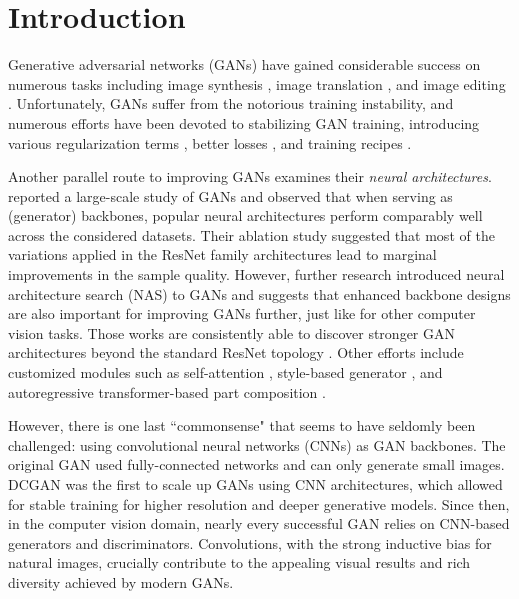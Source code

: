 \documentclass{article}
\begin{document}
\section{Introduction}
\label{introduction}
Generative adversarial networks (GANs) have gained considerable success on numerous tasks including image synthesis \cite{radford2015unsupervised,arjovsky2017wasserstein,gulrajani2017improved,miyato2018spectral,brock2018large}, image translation \cite{isola2017image,zhu2017unpaired,zhu2017toward,chen2020distilling}, and image editing \cite{yang2019controllable,jiang2021enlightengan}. Unfortunately, GANs suffer from the notorious training instability, and numerous efforts have been devoted to stabilizing GAN training, introducing various regularization terms \cite{kurach2019large,roth2017stabilizing,zhang2019consistency,mescheder2018training}, better losses \cite{gulrajani2017improved,mao2017least,jolicoeur2018relativistic,li2017mmd}, and training recipes \cite{salimans2016improved,karras2017progressive}.

Another parallel route to improving GANs examines their \textit{neural architectures}. \cite{lucic2018gans,kurach2019large} reported a large-scale study of GANs and observed that when serving as (generator) backbones, popular neural architectures perform comparably well across the considered datasets. Their ablation study suggested that most of the variations applied in the ResNet family architectures lead to marginal improvements in the sample quality. However, further research introduced neural architecture search (NAS) to GANs and suggests that enhanced backbone designs are also important for improving GANs further, just like for other computer vision tasks. Those works are consistently able to discover stronger GAN architectures beyond the standard ResNet topology \cite{gong2019autogan,gao2020adversarialnas,tian2020off}. Other efforts include customized modules such as self-attention \cite{zhang2019self},  style-based generator \cite{karras2019style}, and autoregressive transformer-based part composition \cite{esser2020taming}.

However, there is one last ``commonsense" that seems to have seldomly been challenged: using convolutional neural networks (CNNs) as GAN backbones. The original GAN \cite{goodfellow2014generative,denton2015deep} used fully-connected networks and can only generate small images. DCGAN \cite{radford2015unsupervised} was the first to scale up GANs using CNN architectures, which allowed for stable training for higher resolution and deeper generative models. Since then, in the computer vision domain, nearly every successful GAN  relies on CNN-based generators and discriminators. Convolutions, with the strong inductive bias for natural images, crucially contribute to the appealing visual results and rich diversity achieved by modern GANs.
\end{document}
